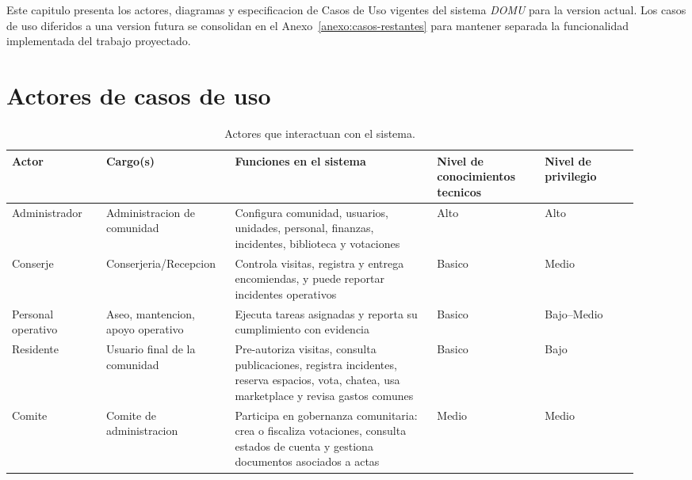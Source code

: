 
\newcommand{\cutop}[2]{%
  \multicolumn{2}{|l|}{\textbf{#1\;\;#2}}\\\hline
}
\newcommand{\cusec}[2]{%
  \multicolumn{2}{|p{0.96\linewidth}|}{\textbf{#1:}\;#2}\\\hline
}
\newcommand{\cuheader}[2]{\textbf{#1} & \textbf{#2}\\\hline}

\begingroup
\small
\setlength{\tabcolsep}{4pt}
\renewcommand{\arraystretch}{1.08}

\label{cap:analisis}

\noindent Este capitulo presenta los actores, diagramas y especificacion de Casos de Uso vigentes del sistema \textit{DOMU} para la version actual. Los casos de uso diferidos a una version futura se consolidan en el Anexo~\ref{anexo:casos-restantes} para mantener separada la funcionalidad implementada del trabajo proyectado.

\section{Actores de casos de uso}
\begin{table}[H]
\centering
\setlength{\tabcolsep}{3pt}
\renewcommand{\arraystretch}{1.10}
\begin{tabular}{|p{0.14\linewidth}|p{0.18\linewidth}|p{0.30\linewidth}|p{0.16\linewidth}|p{0.14\linewidth}|}
\hline
\textbf{Actor} & \textbf{Cargo(s)} & \textbf{Funciones en el sistema} &
\textbf{Nivel de conocimientos tecnicos} & \textbf{Nivel de privilegio} \\\hline

Administrador & Administracion de comunidad & Configura comunidad, usuarios, unidades, personal, finanzas, incidentes, biblioteca y votaciones & Alto & Alto \\\hline

Conserje & Conserjeria/Recepcion & Controla visitas, registra y entrega encomiendas, y puede reportar incidentes operativos & Basico & Medio \\\hline

Personal operativo & Aseo, mantencion, apoyo operativo & Ejecuta tareas asignadas y reporta su cumplimiento con evidencia & Basico & Bajo--Medio \\\hline

Residente & Usuario final de la comunidad & Pre-autoriza visitas, consulta publicaciones, registra incidentes, reserva espacios, vota, chatea, usa marketplace y revisa gastos comunes & Basico & Bajo \\\hline

Comite & Comite de administracion & Participa en gobernanza comunitaria: crea o fiscaliza votaciones, consulta estados de cuenta y gestiona documentos asociados a actas & Medio & Medio \\\hline
\end{tabular}
\caption{Actores que interactuan con el sistema.}
\label{tab:actores}
\end{table}

